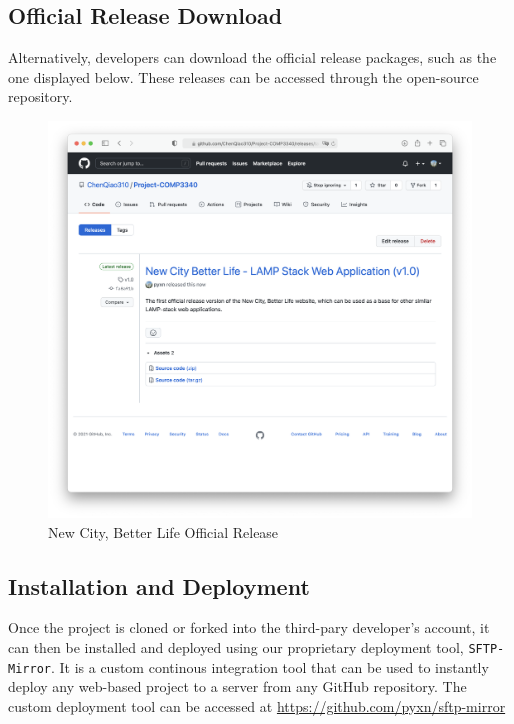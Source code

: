 \documentclass[12pt, letterpaper]{article}
\begin{document}
\subsection*{Official Release Download}
Alternatively, developers can download the official release packages, such as the one displayed below. These releases can be accessed through the open-source repository.

\begin{figure}[htbp]
	\centering
	\includegraphics[width=\textwidth]{images/25-release.png}
	\caption{New City, Better Life Official Release}
 \end{figure}

\subsection*{Installation and Deployment}
Once the project is cloned or forked into the third-pary developer's account, it can then be installed and deployed using our proprietary deployment tool, \lstinline{SFTP-Mirror}. It is a custom continous integration tool that can be used to instantly deploy any web-based project to a server from any GitHub repository. The custom deployment tool can be accessed at \url{https://github.com/pyxn/sftp-mirror}
\end{document}
